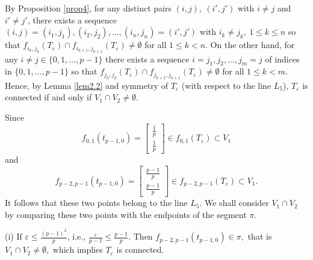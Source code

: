 \documentclass[12pt, reqno]{amsart}
\numberwithin{equation}{section}
\begin{document}
By Proposition \ref{prop4}, for any distinct pairs $(i,j),\ (i',j')$ with $i\neq j$ and $i'\neq j'$, there exists a sequence $(i,j)=(i_1,j_1),(i_2,j_2),\dots,(i_n,j_n)=(i',j')$ with $i_k\neq j_k,\ 1\leq k\leq n$ so that  $f_{i_k,j_k}(T_{\varepsilon})\cap f_{i_{k+1},j_{k+1}}(T_{\varepsilon})\neq\emptyset$ for all $1\leq k<n.$ On the other hand, for any $i\neq j\in\{0,1,\dots,p-1\}$ there exists a sequence $i=j_1,j_2,\dots,j_m=j$ of indices in $\{0,1,\dots,p-1\}$ so that $f_{j_k,j_k}(T_{\varepsilon})\cap f_{j_{k+1},j_{k+1}}(T_{\varepsilon})\neq\emptyset$ for all $1\leq k<m$.
Hence, by Lemma \ref{lem2.2} and symmetry of $T_{\varepsilon}$ (with respect to the line $L_5$), $T_{\varepsilon}$ is connected if and only if $V_{1}\cap V_{2}\neq\emptyset$.

Since
$$f_{0,1}(t_{p-1,0})=\left[\begin{array}{c}\frac1p\\\frac1p\end{array}\right]\in f_{0,1}(T_{\varepsilon})\subset V_{1}$$ and
$$f_{p-2,p-1}(t_{p-1,0})=\left[\begin{array}{c}\frac{p-1}p\\\frac{p-1}p\end{array}\right]\in f_{p-2,p-1}(T_{\varepsilon})\subset V_{1}.$$
It follows that these two points belong to the line $L_{5}$.  We shall consider $V_1\cap V_2$ by comparing these two points with the endpoints of the segment $\pi$.


(i) If  $\varepsilon\leq\frac{(p-1)^{2}}{p}$, i.e., $\frac{\varepsilon}{p-1}\leq\frac{p-1}{p}$. Then $f_{p-2,p-1}(t_{p-1,0})\in\pi,$ that is $V_{1}\cap V_{2}\neq\emptyset,$
which implies $T_{\varepsilon}$ is connected.
\end{document}
